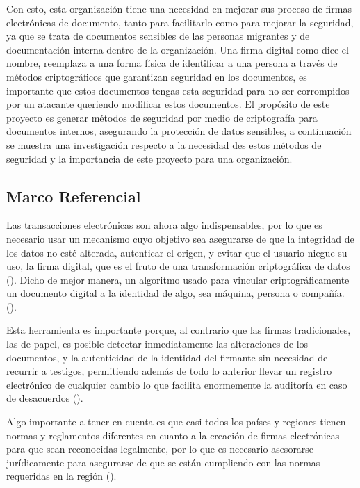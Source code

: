 \documentclass[12pt]{article}
\begin{document}
Con esto, esta organización tiene una necesidad en mejorar sus proceso de firmas electrónicas de documento, tanto para facilitarlo como para mejorar la seguridad, ya que se trata de documentos sensibles de las personas migrantes y de documentación interna dentro de la organización.
Una firma digital como dice el nombre, reemplaza a una forma física de identificar a una persona a través de métodos criptográficos que garantizan seguridad en los documentos, es importante que estos documentos tengas esta seguridad para no ser corrompidos por un atacante queriendo modificar estos documentos. El propósito de este proyecto es generar métodos de seguridad por medio de criptografía para documentos internos, asegurando la protección de datos sensibles, a continuación se muestra una investigación respecto a la necesidad des estos métodos de seguridad y la importancia de este proyecto para una organización.



\newpage







\subsection{Marco Referencial} %
Las transacciones electrónicas son ahora algo indispensables, por lo que es necesario usar un mecanismo cuyo objetivo sea asegurarse de que la integridad de los datos no esté alterada, autenticar el origen, y evitar que el usuario niegue su uso, la firma digital, que es el fruto de una transformación criptográfica de datos (\cite{NIST:2023}). Dicho de mejor manera, un algoritmo usado para vincular criptográficamente un documento digital a la identidad de algo, sea máquina, persona o compañía.  (\cite{Entrust}).  

Esta herramienta es importante porque, al contrario que las firmas tradicionales, las de papel, es posible detectar inmediatamente las alteraciones de los documentos, y  la autenticidad de la identidad del firmante sin necesidad de recurrir a testigos, permitiendo además de todo lo anterior llevar un registro electrónico de cualquier cambio lo que facilita enormemente la auditoría en caso de desacuerdos (\cite{Entrust}).

Algo importante a tener en cuenta es que casi todos los países y regiones tienen normas y reglamentos diferentes en cuanto a la creación de firmas electrónicas para que sean reconocidas legalmente, por lo que es necesario asesorarse jurídicamente para asegurarse de que se están cumpliendo con las normas requeridas en la región (\cite{Entrust}).
\end{document}
